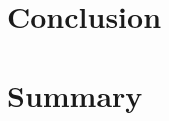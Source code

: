 \documentclass[a4paper,twoside,12pt,appendixprefix=true,bibliography=totoc,listof=totoc]{scrbook}
\begin{document}
\chapter{Conclusion}
\label{sec: Conclusion}


\chapter{Summary}
\label{sec: Summary}


\printbibliography
\listoffigures
\listoftables


%	     
\end{document}
